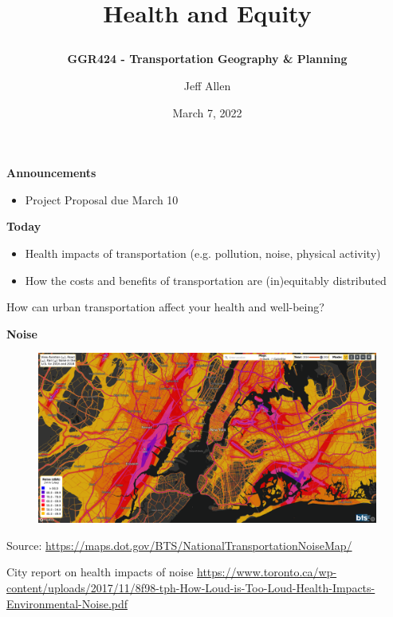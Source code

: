 \documentclass[aspectratio=169]{beamer}
\title{\textbf{Health and Equity}
\subtitle{\textbf{GGR424 - Transportation Geography \& Planning}}
\author{Jeff Allen}
\institute{University of Toronto}
\date{March 7, 2022}}
\begin{document}
	
\begin{frame}
	\titlepage	
\end{frame}





\begin{frame}
	
	\textbf{Announcements}
	
	\begin{itemize}
		\item Project Proposal due March 10
	\end{itemize}
	
	
	\textbf{Today}
	
	\begin{itemize}
		\item Health impacts of	transportation (e.g. pollution, noise, physical activity)
		\item How the costs and benefits of transportation are (in)equitably distributed
		
	\end{itemize}
\end{frame}




\begin{frame}
	
	How can urban transportation affect your health and well-being?
	
\end{frame}



\begin{frame}
	
	\textbf{Noise}
	
	\begin{figure}
		\centering
		\includegraphics[width=1\linewidth]{images/noise_nyc.png}
	\end{figure}
	\tiny Source: \url{https://maps.dot.gov/BTS/NationalTransportationNoiseMap/}
	
	\vspace{2mm}
	\tiny City report on health impacts of noise \url{https://www.toronto.ca/wp-content/uploads/2017/11/8f98-tph-How-Loud-is-Too-Loud-Health-Impacts-Environmental-Noise.pdf}
	
\end{frame}
\end{document}
